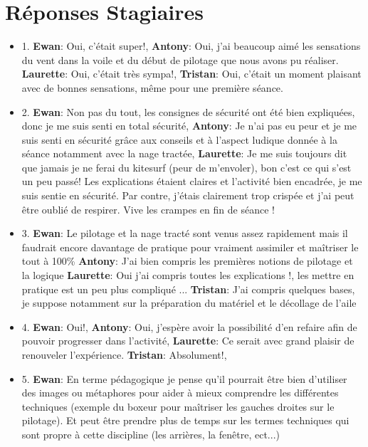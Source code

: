 \documentclass[11pt,a4paper]{report}
\begin{document}
\chapter{Réponses Stagiaires\label{reponses}}
\begin{itemize}
\item 1. \textbf{Ewan}: Oui, c'était super!, \textbf{Antony}: Oui, j'ai
beaucoup aimé les sensations du vent  dans la voile et du début de
pilotage que nous avons  pu réaliser.                                      
\textbf{Laurette}: Oui, c'était très sympa!, \textbf{Tristan}: Oui,
c'était un moment plaisant avec de bonnes sensations, m\^eme pour
une première séance.
\item 2. \textbf{Ewan}: Non pas du tout, les consignes de sécurité
ont été bien expliquées, donc je me suis senti en total sécurité,
\textbf{Antony}: Je n'ai pas eu peur et je me suis senti en
sécurité gr\^ace aux conseils et à l'aspect ludique donnée à la séance 
notamment avec la nage tractée, \textbf{Laurette}: Je me suis
toujours dit que jamais je ne ferai du kitesurf (peur de m'envoler),
bon c'est ce qui s'est un peu passé! Les explications étaient 
claires et l'activité bien encadrée, je me suis sentie en sécurité.
Par contre, j'étais clairement trop crispée et j'ai peut \^etre
oublié de respirer. Vive les crampes en fin de séance ! 
\item 3. \textbf{Ewan}: Le pilotage et la nage tracté sont venus
assez rapidement mais il faudrait encore davantage de pratique
pour vraiment assimiler et maîtriser le tout à 100\%
\textbf{Antony}: J'ai bien compris les premières notions de
pilotage et la logique \textbf{Laurette}: Oui j'ai compris
toutes les explications !, les mettre en pratique est un
peu plus compliqué ...
\textbf{Tristan}: J'ai compris quelques bases, je suppose
notamment sur la préparation du matériel et le décollage de l'aile
\item 4. \textbf{Ewan}: Oui!, \textbf{Antony}: Oui, j'espère
avoir la possibilité d'en refaire afin de pouvoir progresser
dans l'activité, \textbf{Laurette}: Ce serait avec grand plaisir
de renouveler l'expérience.
\textbf{Tristan}: Absolument!, 
\item 5. \textbf{Ewan}: En terme pédagogique je pense qu'il
pourrait \^etre bien d'utiliser des images ou métaphores pour
aider à mieux comprendre les différentes techniques (exemple
du boxeur pour maîtriser les gauches droites sur le  pilotage).
Et peut \^etre prendre plus de temps sur les termes techniques
qui sont propre à cette discipline (les arrières, la fen\^etre, ect...) 

\end{itemize}
\end{document}
